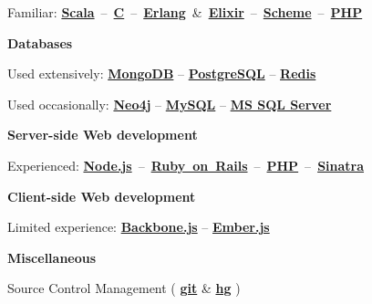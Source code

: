 \documentclass{tccv}
\begin{document}
{{\hspace{3pt}%
Familiar:
\mbox{\href{http://www.scala-lang.org}{\bf Scala} -- %
     \href{https://en.wikipedia.org/wiki/C_(programming_language)}{\bf C} -- %
     \href{http://www.erlang.org}{\bf Erlang} \& %
     \href{http://elixir-lang.org}{\bf Elixir} --  %
     \href{http://schemers.org}{\bf Scheme} -- %
     \href{http://php.net}{\bf PHP}%
}



\vspace{9pt}

\textsf{\textbf{Databases}}
	 
\hspace{3pt}%
Used extensively: %
     \href{http://www.mongodb.org}{\bf MongoDB} -- %
     \href{http://www.postgresql.org}{\bf PostgreSQL} -- %
     \href{http://redis.io}{\bf Redis}%

\hspace{3pt}%
Used occasionally: %
     \href{http://www.neo4j.org}{\bf Neo4j} -- %
     \href{http://www.mysql.com}{\bf MySQL} -- %
     \href{http://www.microsoft.com/en-us/sqlserver/default.aspx}{\bf MS SQL Server}%




\vspace{9pt}

\textsf{\textbf{Server-side Web development}}
 
\hspace{3pt}%
Experienced: %
\mbox{\href{http://nodejs.org}{\bf Node.js} -- %
     \href{http://rubyonrails.org}{\bf Ruby on Rails} -- %
     \href{http://php.net}{\bf PHP} -- %
     \href{http://www.sinatrarb.com}{\bf Sinatra}%
}



\vspace{9pt}

\textsf{\textbf{Client-side Web development}}
	 
\hspace{3pt}%
Limited experience: %
     \href{http://backbonejs.org}{\bf Backbone.js} -- %
     \href{http://emberjs.com}{\bf Ember.js}%



\vspace{9pt}

\textsf{\textbf{Miscellaneous}}

\hspace{3pt}%
Source Control Management (%
	\href{http://git-scm.com}{\bf git} \& %
	\href{http://www.selenic.com/mercurial/}{\bf hg}%
)%

}}
\end{document}
